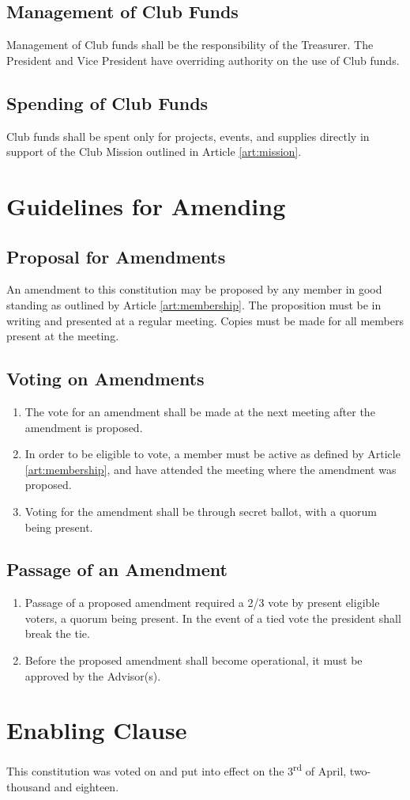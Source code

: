 \documentclass[english,11pt]{article}
\begin{document}
\subsection{Management of Club Funds} \label{sect:funds:management}
Management of Club funds shall be the responsibility of the Treasurer.
The President and Vice President have overriding authority on the use of Club funds.

\subsection{Spending of Club Funds} \label{sect:funds:spending}
Club funds shall be spent only for projects, events, and supplies directly in support of the Club Mission outlined in Article \ref{art:mission}.

\section{Guidelines for Amending} \label{art:amending}

\subsection{Proposal for Amendments} \label{sect:amending:proposal}
An amendment to this constitution may be proposed by any member in good standing as outlined by Article \ref{art:membership}.
The proposition must be in writing and presented at a regular meeting.
Copies must be made for all members present at the meeting.

\subsection{Voting on Amendments}  \label{sect:amending:voting}
\begin{enumerate}[label=\Alph*.]
\item The vote for an amendment shall be made at the next meeting after the amendment is proposed.
\item In order to be eligible to vote, a member must be active as defined by Article \ref{art:membership}, and have attended the meeting where the amendment was proposed.
\item Voting for the amendment shall be through secret ballot, with a quorum being present.
\end{enumerate}

\subsection{Passage of an Amendment} \label{sect:amending:passage}
\begin{enumerate}[label=\Alph*.]
\item Passage of a proposed amendment required a 2/3 vote by present eligible voters, a quorum being present. 
    In the event of a tied vote the president shall break the tie.
\item Before the proposed amendment shall become operational, it must be approved by the Advisor(s).
\end{enumerate}

\section{Enabling Clause} \label{art:enabling}
This constitution was voted on and put into effect on the 3\textsuperscript{rd} of April, two-thousand and eighteen.
\end{document}
